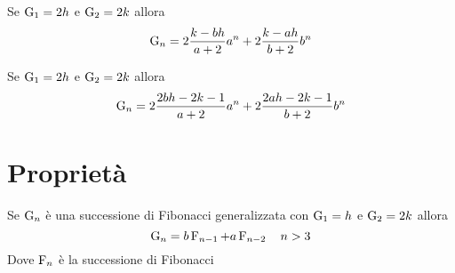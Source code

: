 \begin{commento}
	Se $\operatorname{G}_{1}={}2h$ e $\operatorname{G}_{2}={}2k$ allora \begin{equation}
		\operatorname{G}_{n}={}2\dfrac{k-bh}{a+2}a^n+2\dfrac{k-ah}{b+2}b^n
	\end{equation}
\end{commento}
\begin{commento}
	Se $\operatorname{G}_{1}={}2h$ e $\operatorname{G}_{2}={}2k$ allora \begin{equation}
		\operatorname{G}_{n}={}2\dfrac{2bh-2k-1}{a+2}a^n+2\dfrac{2ah-2k-1}{b+2}b^n
	\end{equation}
\end{commento}
\section{Proprietà}
\begin{thm}[Derivazione]
	Se $\operatorname{G}_{n}$ è una successione di Fibonacci generalizzata  con $\operatorname{G}_{1}=h$ e $\operatorname{G}_{2}=2k $ allora
	\begin{equation}
		\operatorname{G}_{n}=b\operatorname{F}_{n-1}+a\operatorname{F}_{n-2}\quad n>3
	\end{equation}\label{thm:FibGenDer}
	Dove $\operatorname{F}_{n}$ è la successione di Fibonacci
\end{thm}